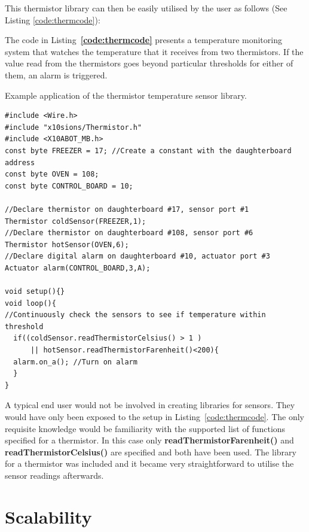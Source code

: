 This thermistor library can then be easily utilised by the user as follows (See Listing \ref{code:thermcode}):

The code in Listing~\textbf{\ref{code:thermcode}} presents a temperature monitoring system that watches the temperature that it receives from two thermistors. If the value read from the thermistors goes beyond particular thresholds for either of them, an alarm is triggered.
\begin{listing}
		\footnotesize
        {\fontsize{8}{6}\selectfont
		\caption{Example application of the thermistor temperature sensor library.} \label{code:thermcode}
		\begin{verbatim}
#include <Wire.h>  
#include "x10sions/Thermistor.h"
#include <X10ABOT_MB.h>
const byte FREEZER = 17; //Create a constant with the daughterboard address
const byte OVEN = 108;
const byte CONTROL_BOARD = 10;

//Declare thermistor on daughterboard #17, sensor port #1
Thermistor coldSensor(FREEZER,1);
//Declare thermistor on daughterboard #108, sensor port #6
Thermistor hotSensor(OVEN,6);
//Declare digital alarm on daughterboard #10, actuator port #3
Actuator alarm(CONTROL_BOARD,3,A);

void setup(){}
void loop(){
//Continuously check the sensors to see if temperature within threshold
  if((coldSensor.readThermistorCelsius() > 1 )
      || hotSensor.readThermistorFarenheit()<200){
  alarm.on_a(); //Turn on alarm 
  }
}
	\end{verbatim}
		}
\end{listing}

A typical end user would not be involved in creating libraries for sensors. They would have only been exposed to the setup in Listing~\ref{code:thermcode}. The only requisite knowledge would be familiarity with the supported list of functions specified for a thermistor. In this case only \textbf{readThermistorFarenheit()} and  \textbf{readThermistorCelsius()} are specified and both have been used.
The library for a thermistor was included and it became very straightforward to utilise the sensor readings afterwards.

\section{Scalability} %
\label{sec:scalability}

